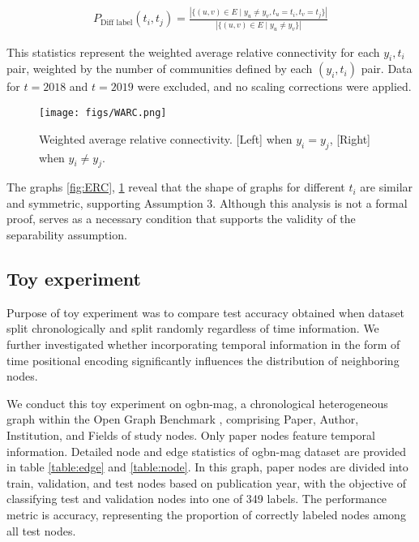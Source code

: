 \begin{align}
P_{\text{Diff label}}(t_i, t_j) = \frac{|\{(u, v) \in E \mid y_u \neq y_v, t_u = t_i, t_v = t_j\}|}{|\{(u, v) \in E \mid y_u \neq y_v\}|}
\end{align}

This statistics represent the weighted average relative connectivity for each $ y_i, t_i $ pair, weighted by the number of communities defined by each $( y_i, t_i )$ pair. Data for $ t = 2018 $ and $ t = 2019 $ were excluded, and no scaling corrections were applied. 
\begin{figure}[hbt!]
	\centering
	\texttt{[image: figs/WARC.png]}
	\vspace{-0.1in}
	\caption{Weighted average relative connectivity. [Left] when $y_i=y_j$, [Right] when $y_i\neq y_j$.}
	 \label{fig:WARC}
\end{figure}

The graphs \ref{fig:ERC}, \ref{fig:WARC} reveal that the shape of graphs for different $ t_i $ are similar and symmetric, supporting Assumption 3. Although this analysis is not a formal proof, serves as a necessary condition that supports the validity of the separability assumption.





\subsection{Toy experiment}
\label{apdx:toy_experiment}
Purpose of toy experiment was to compare test accuracy obtained when dataset split chronologically and split randomly regardless of time information. We further investigated whether incorporating temporal information in the form of time positional encoding significantly influences the distribution of neighboring nodes.

We conduct this toy experiment on ogbn-mag, a chronological heterogeneous graph within the Open Graph Benchmark \cite{OGB}, comprising Paper, Author, Institution, and Fields of study nodes. Only paper nodes feature temporal information. Detailed node and edge statistics of ogbn-mag dataset are provided in table \ref{table:edge} and \ref{table:node}. In this graph, paper nodes are divided into train, validation, and test nodes based on publication year, with the objective of classifying test and validation nodes into one of 349 labels. The performance metric is accuracy, representing the proportion of correctly labeled nodes among all test nodes. 

